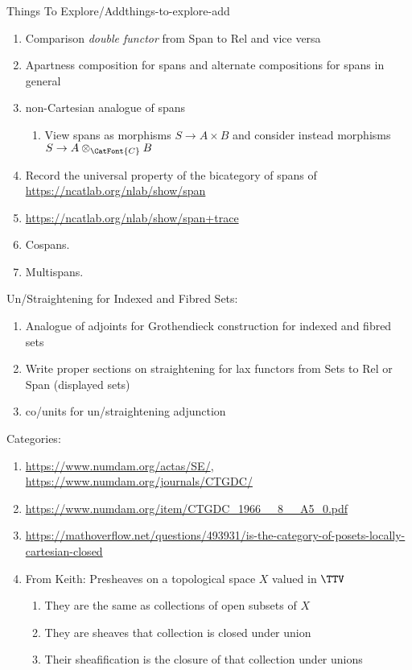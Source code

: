 \begin{remark}{Things To Explore/Add}{things-to-explore-add}
\begin{enumerate}
        \item Comparison \emph{double functor} from Span to Rel and vice versa
        \item Apartness composition for spans and alternate compositions for spans in general
        \item non-Cartesian analogue of spans
            \begin{enumerate}
                \item View spans as morphisms $S\to A\times B$ and consider instead morphisms $S\to A\otimes_{\CatFont{C}}B$
            \end{enumerate}
        \item Record the universal property of the bicategory of spans of \url{https://ncatlab.org/nlab/show/span}
        \item \url{https://ncatlab.org/nlab/show/span+trace}
        \item Cospans.
        \item Multispans.
    \end{enumerate}
    Un/Straightening for Indexed and Fibred Sets:
    \begin{enumerate}
        \item Analogue of adjoints for Grothendieck construction for indexed and fibred sets
        \item Write proper sections on straightening for lax functors from Sets to Rel or Span (displayed sets)
        \item co/units for un/straightening adjunction
    \end{enumerate}
    Categories:
    \begin{enumerate}
        \item \url{https://www.numdam.org/actas/SE/}, \url{https://www.numdam.org/journals/CTGDC/}
        \item \url{https://www.numdam.org/item/CTGDC_1966__8__A5_0.pdf}
        \item \url{https://mathoverflow.net/questions/493931/is-the-category-of-posets-locally-cartesian-closed}
        \item From Keith: Presheaves on a topological space $X$ valued in $\TTV$
            \begin{enumerate}
                \item They are the same as collections of open subsets of $X$
                \item They are sheaves \textiff that collection is closed under union
                \item Their sheafification is the closure of that collection under unions

\end{enumerate}
\end{enumerate}
\end{remark}
